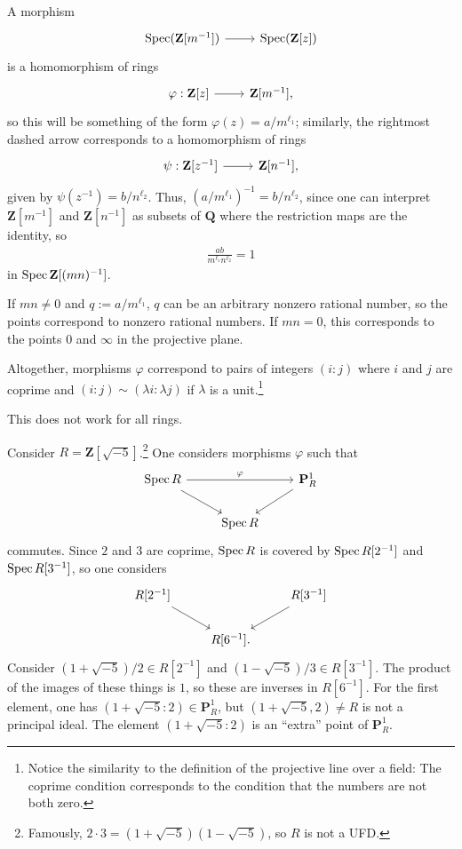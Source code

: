 \documentclass [11 pt, oneside] {article}
\begin{document}
\begin{example}[ ]
\[\]
A morphism 
\[
\begin{tikzcd}
\Spec (\mathbf{Z}[m^{-1}])\ar[r]& \Spec (\mathbf{Z}[z])
\end{tikzcd}
\] 
is a homomorphism of rings 
\[
\begin{tikzcd}
\varphi: \mathbf{Z}[z]\ar[r]& \mathbf{Z}[m^{-1}],
\end{tikzcd}
\] 
so this will be something of the form $\varphi(z)= a/m^{\ell_1}$; similarly, the rightmost dashed arrow corresponds to a homomorphism of rings 
\[
\begin{tikzcd}
\psi: \mathbf{Z}[z^{-1}]\ar[r]& \mathbf{Z}[n^{-1}],
\end{tikzcd}
\] 
given by $\psi(z^{-1}) = b/n^{\ell_2}$. Thus, $(a/m^{\ell_1}) ^{-1}=b/n^{\ell_2}$, since one can interpret $\mathbf{Z}[m^{-1}]$ and $\mathbf{Z}[n^{-1}]$ as subsets of $\mathbf{Q}$ where the restriction maps are the identity, so
\begin{align*}
	\frac{ab}{m^{\ell_1}n^{\ell_2}}=1
\end{align*}
in $\operatorname{Spec} \mathbf{Z}[(mn) ^{-1}]$.

If $mn\ne 0$ and $q:= a/m^{\ell_1}$, $q$ can be an arbitrary nonzero rational number, so the points correspond to nonzero rational numbers. If $mn=0$, this corresponds to the points $0$ and $\infty$ in the projective plane.

Altogether, morphisms $\varphi$ correspond to pairs of integers $(i:j)$ where $i$ and $j$ are coprime and $(i:j)\sim  (\lambda i :\lambda j)$ if $\lambda$ is a unit.\footnote{Notice the similarity to the definition of the projective line over a field: The coprime condition corresponds to the condition that the numbers are not both zero.}
\end{example}

This does not work for all rings.

\begin{example}[ ]\label{}\text{}
Consider $R=\mathbf{Z}[\sqrt{-5} ]$.\footnote{Famously, $2\cdot 3 = (1+\sqrt{-5} ) (1-\sqrt{-5} )$, so $R$ is not a UFD.} One considers morphisms $\varphi$ such that
\[
\begin{tikzcd}
	\Spec R \ar[rr,"\varphi"] \ar[dr] &&\mathbf{P}^1_{R}\ar[dl]\\
				       &\Spec R
\end{tikzcd}
\]
commutes. Since $2$ and $3$ are coprime, $\operatorname{Spec} R$ is covered by $\operatorname{Spec} R[2^{-1}]$ and $\operatorname{Spec} R[3^{-1}]$, so one considers
\[
\begin{tikzcd}
	R[2^{-1}] \ar[rd] && R[3^{-1}] \ar[dl]\\
			  &R[6^{-1}].
\end{tikzcd}
\]
Consider $(1+\sqrt{-5} ) /2\in R[2^{-1}]$ and $(1-\sqrt{-5} ) /3\in R[3^{-1}]$. The product of the images of these things is $1$, so these are inverses in $R[6^{-1}]$. For the first element, one has $(1+\sqrt{-5}:2 ) \in \mathbf{P}^1_{R}$, but $(1+\sqrt{-5}, 2 ) \ne R$ is not a principal ideal. The element $(1+\sqrt{-5}:2 )$ is an ``extra'' point of $\mathbf{P}^1_{R}$. 
\end{example}
\end{document}
